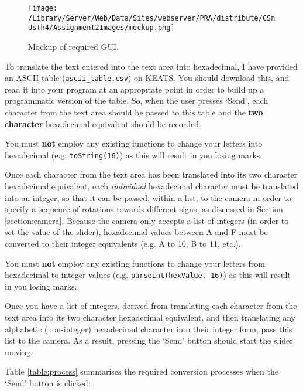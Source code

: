 \documentclass[11pt]{article}
\begin{document}
\begin{figure}[htbp]
\begin{center}
\texttt{[image: /Library/Server/Web/Data/Sites/webserver/PRA/distribute/CSnUsTh4/Assignment2Images/mockup.png]}
\caption{Mockup of required GUI.}
\label{fig:mockup}
\end{center}
\end{figure}

To translate the text entered into the text area into hexadecimal, I have provided an ASCII table (\texttt{ascii\_table.csv}) on KEATS. You should download this, and read it into your program at an appropriate point in order to build up a programmatic version of the table. So, when the user presses `Send', each character from the text area should be passed to this table and the \textbf{two character} hexadecimal equivalent should be recorded.

You must \textbf{not} employ any existing functions to change your letters into hexadecimal (e.g. \texttt{toString(16)}) as this will result in you losing marks. 

Once each character from the text area has been translated into its two character hexadecimal equivalent, each \emph{individual} hexadecimal character must be translated into an integer, so that it can be passed, within a list, to the camera in order to specify a sequence of rotations towards different signs, as discussed in Section \ref{section:camera}. Because the camera only accepts a list of integers (in order to set the value of the slider), hexadecimal values between A and F must be converted to their integer equivalents (e.g. A to 10, B to 11, etc.).

You must \textbf{not} employ any existing functions to change your letters from hexadecimal to integer values (e.g. \texttt{parseInt(hexValue, 16)}) as this will result in you losing marks. 

Once you have a list of integers, derived from translating each character from the text area into its two character hexadecimal equivalent, and then translating any alphabetic (non-integer) hexadecimal character into their integer form, pass this list to the camera. As a result, pressing the `Send' button should start the slider moving.

Table \ref{table:process} summarises the required conversion processes when the `Send' button is clicked:
\end{document}
